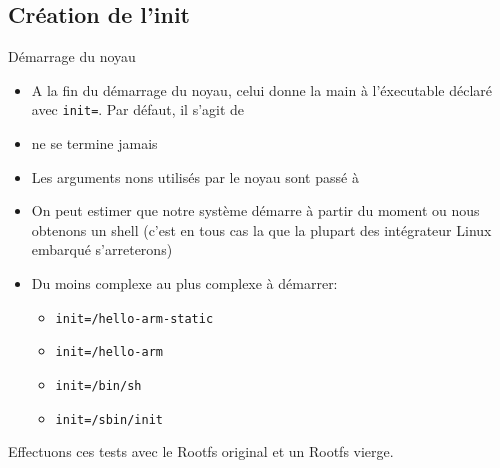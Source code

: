 \subsection{Création de l'init}

\begin{frame}[fragile=singleslide]{Démarrage du noyau}
  \begin{itemize}
  \item  A  la fin  du  démarrage  du noyau,  celui  donne  la main  à
    l'éxecutable déclaré  avec \verb+init=+. Par défaut,  il s'agit de
  \item {} ne se termine jamais
  \item  Les  arguments  nons  utilisés  par le  noyau  sont  passé  à
  \item On peut  estimer que notre système démarre  à partir du moment
    ou nous  obtenons un shell (c'est  en tous cas  la que la
      plupart des intégrateur Linux embarqué s'arreterons)
  \item Du moins complexe au plus complexe à démarrer:
  \begin{itemize}
    \item \verb+init=/hello-arm-static+
    \item \verb+init=/hello-arm+
    \item \verb+init=/bin/sh+
    \item \verb+init=/sbin/init+
    \end{itemize}
  \end{itemize}
  Effectuons ces tests avec le Rootfs original et un Rootfs vierge.
\end{frame}

